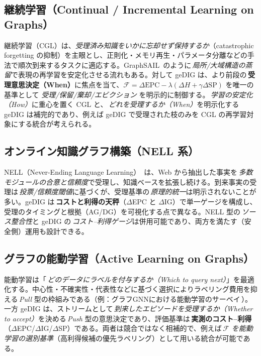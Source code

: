 \documentclass[ja=standard,xelatex]{bxjsarticle}
\newcommand{\F}{\mathcal{F}}
\begin{document}
\subsection{継続学習（Continual / Incremental Learning on Graphs）}
\label{sec:related_continual_graph}
継続学習（CGL）は、\emph{受理済み知識をいかに忘却せず保持するか}（catastrophic forgetting の抑制）を主眼とし、正則化・メモリ再生・パラメータ分離などの手法で順次到来するタスクに適応する。GraphSAIL\,\cite{GraphSAIL2020} のように\,\emph{局所/大域構造の蒸留}で表現の再学習を安定化させる流れもある。対して geDIG は、より前段の\,\textbf{受理意思決定（When）}に焦点を当て、$\F{=}\Delta\mathrm{EPC}{-}\lambda(\Delta H{+}\gamma\Delta\mathrm{SP})$ を唯一の基準として \emph{受理/保留/棄却/エビクション} を明示的に制御する。\,\emph{学習の安定化（How）}に重心を置く CGL と、\,\emph{どれを受理するか（When）}を明示化する geDIG は補完的であり、例えば geDIG で受理された枝のみを CGL の再学習対象にする統合が考えられる。

\subsection{オンライン知識グラフ構築（NELL 系）}
\label{sec:related_nell}
NELL（Never-Ending Language Learning）\,\cite{Mitchell2018NELL} は、Web から抽出した事実を\,\emph{多数モジュールの合意と信頼度}で受理し、知識ベースを拡張し続ける。到来事実の受理は\,\emph{投票/信頼度閾値}に基づくが、受理基準の\,\emph{原理的統一}は明示されないことが多い。geDIG は\,\textbf{コストと利得の天秤}（$\Delta$EPC と $\Delta$IG）で単一ゲージを構成し、受理のタイミングと根拠（AG/DG）を可視化する点で異なる。NELL 型の\,\emph{ソース整合性}と geDIG の\,\emph{コスト–利得ゲージ}は併用可能であり、両方を満たす（安全側）運用も設計できる。

\subsection{グラフの能動学習（Active Learning on Graphs）}
\label{sec:related_active_learning}
能動学習は「\,\emph{どのデータにラベルを付与するか（Which to query next）}」を最適化する。中心性・不確実性・代表性などに基づく選択によりラベリング費用を抑える\,\emph{Pull} 型の枠組みである（例：グラフGNNにおける能動学習のサーベイ\,\cite{AL4GNN2022Survey}）。一方 geDIG は、ストリームとして\,\emph{到来したエピソードを受理するか（Whether to accept）}を決める\,\emph{Push} 型の意思決定であり、評価基準は\,\textbf{実測のコスト–利得}（$\Delta$EPC/$\Delta$IG/$\Delta$SP）である。両者は競合ではなく相補的で、例えば\,\emph{$\F$ を能動学習の選別基準}（高利得候補の優先ラベリング）として用いる統合が可能である。
\end{document}
